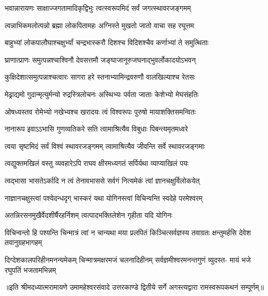 

\addtocounter{shlokacount}{62}

\twolineshloka
{भवान्नारायणः साक्षाज्जगतामादिकृद्विभुः}
{त्वत्स्वरूपमिदं सर्वं जगत्स्थावरजङ्गमम्} %

\twolineshloka
{त्वन्नाभिकमलोत्पन्नो ब्रह्मा लोकपितामहः}
{अग्निस्ते मुखतो जातो वाचा सह रघूत्तम} %

\twolineshloka
{बाहुभ्यां लोकपालौघाश्चक्षुर्भ्यां चन्द्रभास्करौ}
{दिशश्च विदिशश्चैव कर्णाभ्यां ते समुत्थिताः} %

\twolineshloka
{घ्राणात्प्राणः समुत्पन्नश्चाश्विनौ देवसत्तमौ}
{जङ्घाजानूरुजघनाद्भुवर्लोकादयोऽभवन्} %

\twolineshloka
{कुक्षिदेशात्समुत्पन्नाश्चत्वारः सागरा हरे}
{स्तनाभ्यामिन्द्रवरुणौ वालखिल्याश्च रेतसः} %

\twolineshloka
{मेढ्राद्यमो गुदान्मृत्युर्मन्यो रुद्रस्त्रिलोचनः}
{अस्थिभ्यः पर्वता जाताः केशेभ्यो मेघसंहतिः} %

\twolineshloka
{ओषध्यस्तव रोमेभ्यो नखेभ्यश्च खरादयः}
{त्वं विश्वरूपः पुरुषो मायाशक्तिसमन्वितः} %

\twolineshloka
{नानारूप इवाऽऽभासि गुणव्यतिकरे सति}
{त्वामाश्रित्यैव विबुधाः पिबन्त्यमृतमध्वरे} %

\twolineshloka
{त्वया सृष्टमिदं सर्वं विश्वं स्थावरजङ्गमम्}
{त्वामाश्रित्यैव जीवन्ति सर्वे स्थावरजङ्गमाः} %

\twolineshloka
{त्वद्युक्तमखिलं वस्तु व्यवहारेऽपि राघव}
{क्षीरमध्यगतं सर्पिर्यथा व्याप्याखिलं पयः} %

\twolineshloka
{त्वद्भासा भासतेऽर्कादि न त्वं तेनावभाससे}
{सर्वगं नित्यमेकं त्वां ज्ञानचक्षुर्विलोकयेत्} %

\twolineshloka
{नाज्ञानचक्षुस्त्वां पश्येदन्धदृग् भास्करं यथा}
{योगिनस्त्वां विचिन्वन्ति स्वदेहे परमेश्वरम्} %

\twolineshloka
{अतन्निरसनमुखैर्वेदशीर्षैरहर्निशम्}
{त्वत्पादभक्तिलेशेन गृहीता यदि योगिनः} %

\threelineshloka
{विचिन्वन्तो हि पश्यन्ति चिन्मात्रं त्वां न चान्यथा}
{मया प्रलपितं किञ्चित्सर्वज्ञस्य तवाग्रतः}
{क्षन्तुमर्हसि देवेश तवानुग्रहभागहम्} %

\fourlineindentedshloka
{दिग्देशकालपरिहीनमनन्यमेकम्}
{चिन्मात्रमक्षरमजं चलनादिहीनम्}
{सर्वज्ञमीश्वरमनन्तगुणं व्युदस्त-}
{मायं भजे रघुपतिं भजतामभिन्नम्} %


{॥इति श्रीमदध्यात्मरामायणे उमामहेश्वरसंवादे उत्तरकाण्डे द्वितीये  सर्गे
अगस्त्यद्वारा  रामस्वरूपकथनं सम्पूर्णम्॥}
